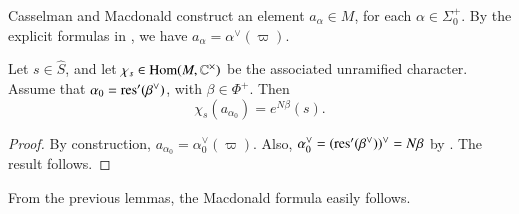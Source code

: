 Casselman and Macdonald construct an element $a_{\alpha}\in M$, for each $\alpha\in\Sigma^+_0$.
By the explicit formulas in \cite{casselman2005companion}, 
we have $a_\alpha = \alpha^\vee(\varpi)$.

\begin{lemma}\label{lemma:translate} 
Let $s\in \hat S$, and let $\chi_s\in{\operatorname{Hom}}(M,\mathbb{C}^\times)$ be the associated
unramified character.  Assume that $\alpha_0 = {\operatorname{res}}'(\beta^\vee)$, with $\beta\in\Phi^+$.
Then
\[
\chi_s(a_{\alpha_0}) = e^{N\beta}(s).
\]
\end{lemma}

\begin{proof}  
By construction, $a_{\alpha_0} = \alpha_0^\vee(\varpi)$.  
Also, $\alpha_0^\vee = ({\operatorname{res}}'(\beta^\vee))^\vee = N\beta$ by \cite[1.3.9]{kottwitz1999foundations}.
The result follows. 
\end{proof}




From the previous lemmas, the Macdonald formula easily follows.

